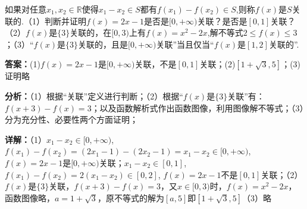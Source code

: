 \begin{question}[points=18]
如果对任意$x_1,x_2\in\mathbb{R}$使得$x_1-x_2\in S$都有$f(x_1)-f(x_2)\in S$,则称$f(x)$是$S$关联的.（1）判断并证明$f(x)=2x-1$是否是$[0,+\infty)$关联？是否是$[0,1]$关联？（2）$f(x)$是$\{3\}$关联的，在$[0,3)$上有$f(x)=x^2-2x$,解不等式$2\le f(x)\le 3$；（3）“$f(x)$是$\{3\}$关联的，且是$[0,+\infty)$关联”当且仅当“$f(x)$是$[1,2]$关联的”.
\begin{solution}
\textbf{答案：}(1)$f(x)=2x-1$是$[0,+\infty)$关联，不是$[0,1]$关联；(2)$[1+\sqrt{3},5]$；(3)证明略

\textbf{分析：}（1）根据“关联”定义进行判断；（2）根据“$f(x)$是$\{3\}$关联”有：$f(x+3)-f(x)=3$；以及函数解析式作出函数图像，利用图像解不等式；（3）分为充分性、必要性两个方面证明；

\textbf{详解：}（1）$x_1-x_2\in[0,+\infty)$, $f(x_1)-f(x_2)=(2x_1-1)-(2x_2-1)=x_1-x_2\in[0,+\infty)$, $f(x)=2x-1$是$[0,+\infty)$关联；$x_1-x_2\in[0,1]$, $f(x_1)-f(x_2)=2(x_1-x_2)\in[0,2]$, $f(x)=2x-1$不是$[0,1]$关联；（2）$f(x)$是$\{3\}$关联，$f(x+3)-f(x)=3$，又$x\in[0,3)$时，$f(x)=x^2-2x$，函数图像略，$a=1+\sqrt{3}$，原不等式的解为$[a,5]$即$[1+\sqrt{3},5]$（3）略
\end{solution}
\end{question}

